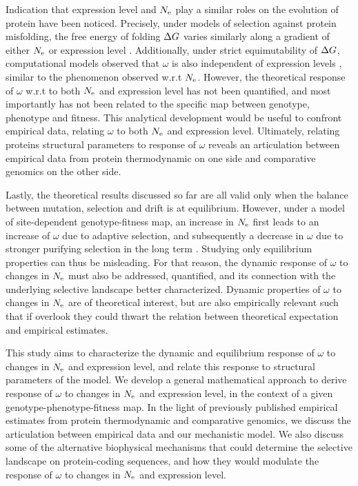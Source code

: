 Indication that expression level and $N_{\mathrm{e}}$ play a similar roles on the evolution of protein have been noticed.
Precisely, under models of selection against protein misfolding, the free energy of folding $\Delta G$ varies similarly along a gradient of either $N_{\mathrm{e}}$ or expression level \citep{Serohijos2013}.
Additionally, under strict equimutability of $\Delta G$, computational models observed that $\omega$ is also independent of expression levels \citep{Serohijos2012}, similar to the phenomenon observed w.r.t $N_{\mathrm{e}}$.
However, the theoretical response of $\omega$ w.r.t to both $N_{\mathrm{e}}$ and expression level has not been quantified, and most importantly has not been related to the specific map between genotype, phenotype and fitness.
This analytical development would be useful to confront empirical data, relating $\omega$ to both $N_{\mathrm{e}}$ and expression level.
Ultimately, relating proteins structural parameters to response of $\omega$ reveals an articulation between empirical data from protein thermodynamic on one side and comparative genomics on the other side. 

Lastly, the theoretical results discussed so far are all valid only when the balance between mutation, selection and drift is at equilibrium.
However, under a model of site-dependent genotype-fitness map, an increase in $N_{\mathrm{e}}$ first leads to an increase of $\omega$ due to adaptive selection, and subsequently a decrease in $\omega$ due to stronger purifying selection in the long term \citep{Jones2016}.
Studying only equilibrium properties can thus be misleading.
For that reason, the dynamic response of $\omega$ to changes in $N_{\mathrm{e}}$ must also be addressed, quantified, and its connection with the underlying selective landscape better characterized.
Dynamic properties of $\omega$ to changes in $N_{\mathrm{e}}$ are of theoretical interest, but are also empirically relevant such that if overlook they could thwart the relation between theoretical expectation and empirical estimates.

This study aims to characterize the dynamic and equilibrium response of $\omega$ to changes in $N_{\mathrm{e}}$ and expression level, and relate this response to structural parameters of the model.
We develop a general mathematical approach to derive response of $\omega$ to changes in $N_{\mathrm{e}}$ and expression level, in the context of a given genotype-phenotype-fitness map.
In the light of previously published empirical estimates from protein thermodynamic and comparative genomics, we discuss the articulation between empirical data and our mechanistic model.
We also discuss some of the alternative biophysical mechanisms that could determine the selective landscape on protein-coding sequences, and how they would modulate the response of $\omega$ to changes in $N_{\mathrm{e}}$ and expression level.

